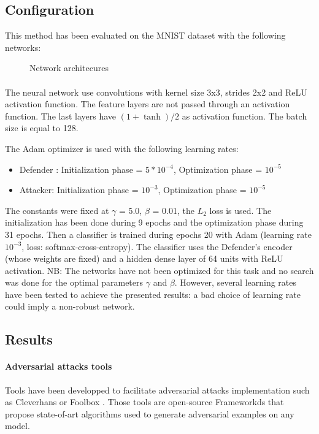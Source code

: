 \documentclass[12pt]{article}
\begin{document}
\subsection{Configuration}
This method has been evaluated on the MNIST dataset with the following networks:

\begin{figure}[H]
\centering
{}
\label{architecture}
\caption{Network architecures}
\end{figure}

\paragraph{}
The neural network use convolutions with kernel size 3x3, strides 2x2 and ReLU activation function. The feature layers are not passed through an activation function. The last layers have $(1+ \tanh)/2$ as activation function. The batch size is equal to 128. 

The Adam optimizer is used with the following learning rates:
\begin{itemize}
\item Defender : Initialization phase = $5 * 10^{-4}$, Optimization phase = $10^{-5}$
\item Attacker: Initialization phase = $10^{-3}$, Optimization phase = $10^{-5}$
\end{itemize}

The constants were fixed at $\gamma$ = 5.0, $\beta$ = 0.01, the $L_{2}$ loss is used.
The initialization has been done during 9 epochs and the optimization phase during 31 epochs.
Then a classifier is trained during epochs 20 with Adam (learning rate $10^{-3}$, loss: softmax-cross-entropy). The classifier uses the Defender’s encoder (whose weights are fixed) and a hidden dense layer of 64 units with ReLU activation.
NB: The networks have not been optimized for this task and no search was done for the optimal parameters  $\gamma$ and $\beta$. However, several learning rates have been tested to achieve the presented results: a bad choice of learning rate could imply a non-robust network.

\subsection{Results}
\paragraph{Adversarial attacks tools}
Tools have been developped to facilitate adversarial attacks implementation such as Cleverhans\cite{papernot2018cleverhans} or Foolbox \cite{rauber_foolbox:_2017}. Those tools are open-source Frameworkds that propose state-of-art algorithms used to generate adversarial examples on any model.
\end{document}
